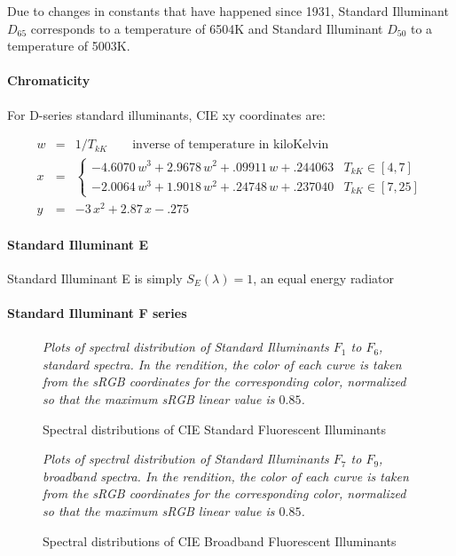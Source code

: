 Due to changes in constants that have happened since 1931, Standard Illuminant $D_{65}$
corresponds to a temperature of \num{6504}\unit{\kelvin} and Standard Illuminant $D_{50}$
to a temperature of \num{5003}\unit{\kelvin}.

\paragraph{Chromaticity}
For D-series standard illuminants, \gls{CIE} xy coordinates are:

\begin{equation}
\begin{array}{rcl}
w & = & 1/T_{kK} \qquad \text{inverse of temperature in kiloKelvin}  \\
x & = & \begin{cases}
         - 4.6070\,w^3 + 2.9678 \,w^2 + .09911\,w + .244063  & T_{kK} \in [4, 7] \\
         - 2.0064\,w^3 + 1.9018\,w^2  +  .24748\,w + .237040 & T_{kK} \in [7, 25]
    \end{cases} \\
y & = & -3\,x^2  + 2.87\,x - .275
\end{array}
\end{equation}


\paragraph{Standard Illuminant E}

Standard Illuminant E is simply $S_E(\lambda) = 1$, an equal energy radiator

\paragraph{Standard Illuminant F series}

\begin{figure}
\small
\centering

\caption{Spectral distributions of CIE Standard Fluorescent Illuminants}
\label{fig:illumfspectrastd}
\vskip 1mm
{\footnotesize\it Plots of spectral distribution of
Standard Illuminants $F_1$ to $F_6$, standard spectra.
In the rendition, the color of each curve is taken from the
sRGB coordinates for the corresponding color,
normalized so that the maximum sRGB linear value is $0.85$.
}
\end{figure}

\begin{figure}
{
\small
\centering

\caption{Spectral distributions of CIE Broadband Fluorescent Illuminants}
\label{fig:illumfspectrabroad}
}
\vskip 1mm
{\footnotesize\it Plots of spectral distribution of
Standard Illuminants $F_7$ to $F_9$, broadband spectra.
In the rendition, the color of each curve is taken from the
sRGB coordinates for the corresponding color,
normalized so that the maximum sRGB linear value is $0.85$.
}
\end{figure}

